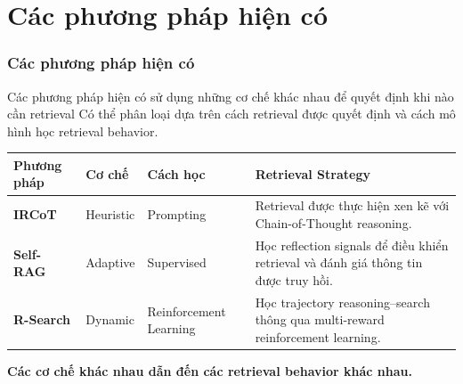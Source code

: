 
\section{Các phương pháp hiện có}


\begin{frame}
    \frametitle{Các phương pháp hiện có}

    \begin{block}{Các phương pháp hiện có sử dụng những cơ chế khác nhau
    để quyết định khi nào cần retrieval}
        Có thể phân loại dựa trên cách retrieval được quyết định
        và cách mô hình học retrieval behavior.
    \end{block}

    \vspace{0.2cm}

    \begin{center}
    \small
    \renewcommand{\arraystretch}{1.45}

    \begin{tabular}{p{2.5cm} p{2.4cm} p{2.3cm} p{5.0cm}}
        \toprule
        \textbf{Phương pháp} &
        \textbf{Cơ chế} &
        \textbf{Cách học} &
        \textbf{Retrieval Strategy} \\
        \midrule

        \textbf{IRCoT}
        &
        Heuristic
        &
        Prompting
        &
        Retrieval được thực hiện xen kẽ với
        Chain-of-Thought reasoning.
        \\[0.1cm]

        \textbf{Self-RAG}
        &
        Adaptive
        &
        Supervised
        &
        Học reflection signals để điều khiển retrieval
        và đánh giá thông tin được truy hồi.
        \\[0.1cm]

        \textbf{R-Search}
        &
        Dynamic
        &
        Reinforcement Learning
        &
        Học trajectory reasoning--search thông qua
        multi-reward reinforcement learning.
        \\

        \bottomrule
    \end{tabular}

    \end{center}

    \vspace{0.2cm}

    \begin{center}
        \textbf{\large
        Các cơ chế khác nhau dẫn đến các retrieval behavior khác nhau.
        }
    \end{center}

\end{frame}


